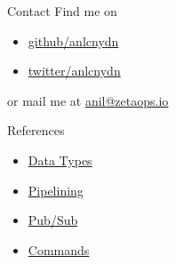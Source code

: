 \documentclass[10pt]{beamer}
\begin{document}
\begin{frame}[fragile]{Contact}
  Find me on
  \begin{itemize}
    \item \href{https://github.com/anlcnydn}{github/anlcnydn}
    \item \href{https://twitter.com/anlcnydn}{twitter/anlcnydn}
  \end{itemize}
  or mail me at \href{mailto:anil@zetaops.io}{anil@zetaops.io}
\end{frame}

\begin{frame}{References}
  \begin{itemize}
    \item \href{https://redis.io/topics/data-types-intro}{Data Types}
    \item \href{https://redis.io/topics/pipelining}{Pipelining}
    \item \href{https://redis.io/topics/pubsub}{Pub/Sub}
    \item \href{https://redis.io/commands}{Commands}
  \end{itemize}
\end{frame}
\end{document}
